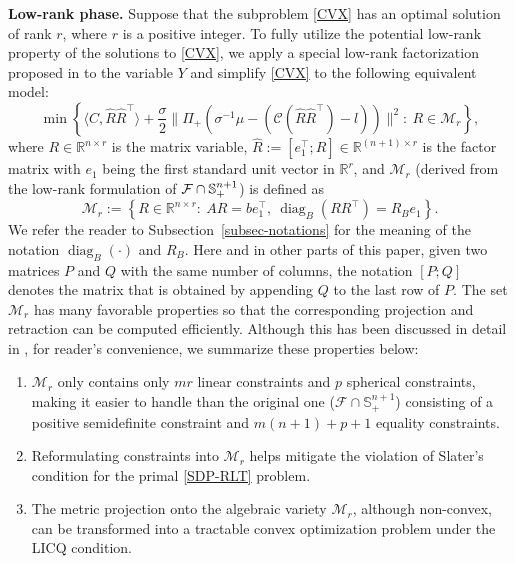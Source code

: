 \documentclass[11pt]{article}
\theoremstyle{plain}
\def\<{\big\langle}
\def\>{\big\rangle}
\def\M{\mathcal{M}}
\def\C{\mathcal{C}}
\def\R{\mathbb{R}}
\def\S{\mathbb{S}}
\def\hR{\widehat{R}}
\def\tb#1{\textbf{#1}}
\begin{document}
\noindent\tb{Low-rank phase.} Suppose that the subproblem \eqref{CVX} has an optimal solution of rank $r$, where $r$ is a positive integer. To fully utilize the potential low-rank property of the solutions to \eqref{CVX}, we apply a special low-rank factorization proposed in \cite{RiNNAL} to the variable $Y$ and simplify \eqref{CVX} to the following equivalent model:
\begin{equation}
    \min\left\{\<C,\hR\hR^\top\>+\frac{\sigma}{2}\| \Pi_{+}( \sigma^{-1}\mu-(\C(\hR\hR^\top)-l)) \|^2 :\ R\in \M_r \right\},\label{LR}
\tag{LR}
\end{equation}
where $R\in \R^{n\times r}$ is the matrix variable, $\hR:=[e_1^\top;R]\in\R^{(n+1)\times r}$ is the factor matrix with $e_1$ being the first standard unit vector in $\R^r$, and $\M_r$ (derived from the low-rank formulation
of ${\cal F}\cap \S^{n+1}_+$) is defined as 
\begin{equation*}
\mathcal{M}_r := \left\{R \in \mathbb{R}^{n \times r} :\  AR=be_1^\top,\ \operatorname{diag}_B(RR^{\top})=R_B e_1 \right\}.
\end{equation*}
We refer the reader to Subsection~\ref{subsec-notations} for the meaning of the notation $\operatorname{diag}_B(\cdot)$ and $R_B$.
Here and in other parts of this paper, given two matrices $P$ and 
$Q$ with the same number of 
columns, the notation $[P;Q]$ denotes the matrix that is obtained by appending $Q$ to the 
last row of $P$. The set $\M_r$ has many favorable properties so that the corresponding 
projection and retraction can be computed efficiently. Although this has been discussed in detail in \cite{tang2024solving,RiNNAL}, for reader's convenience, we summarize these properties below: 
\begin{enumerate}
    \item $\M_r$ only contains only $mr$ linear constraints and $p$ 
    spherical constraints, making it easier to handle than the original one 
    ($\mathcal{F}\cap\mathbb{S}^{n+1}_+$) consisting of a positive semidefinite constraint and $m(n+1)+p+1$ equality constraints.
    \item Reformulating constraints into $\M_r$ helps mitigate the violation of Slater’s condition for the primal \eqref{SDP-RLT} problem.
    \item The metric projection onto the algebraic variety $\M_r$, although non-convex, can be transformed into a tractable convex optimization problem under the LICQ condition.
\end{enumerate}
\end{document}
